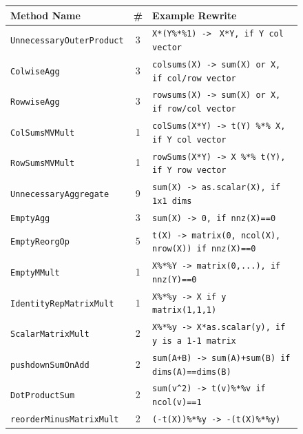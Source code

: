 \begin{figure}
    \centering
    \begin{tabular}{|l|c|l|}
    \hline
     Method Name & \# & Example Rewrite \\
     \hline
     
\verb|UnnecessaryOuterProduct| & 3 & \verb|X*(Y%*%1) ->| \verb| X*Y, if Y col vector |\\

\verb|ColwiseAgg| & 3 & \verb|colsums(X) -> sum(X) or X, if col/row vector |\\

\verb|RowwiseAgg| & 3 & \verb|rowsums(X) -> sum(X) or X, if row/col vector |\\

\verb|ColSumsMVMult| & 1 & \verb|colSums(X*Y) -> t(Y) %*% X, if Y col vector |\\

\verb|RowSumsMVMult| & 1 & \verb|rowSums(X*Y) -> X %*% t(Y), if Y row vector |\\

\verb|UnnecessaryAggregate| & 9 & \verb|sum(X) -> as.scalar(X), if 1x1 dims |\\
\verb|EmptyAgg| & 3 & \verb|sum(X) -> 0, if nnz(X)==0 |\\
\verb|EmptyReorgOp| & 5 & \verb|t(X) -> matrix(0, ncol(X), nrow(X)) if nnz(X)==0|\\
\verb|EmptyMMult| & 1 & \verb|X%*%Y -> matrix(0,...), if nnz(Y)==0|\\
\verb|IdentityRepMatrixMult| & 1 & \verb|X%*%y -> X if y matrix(1,1,1) |\\
\verb|ScalarMatrixMult| & 2 & \verb|X%*%y -> X*as.scalar(y), if y is a 1-1 matrix |\\
\verb|pushdownSumOnAdd| & 2 & \verb|sum(A+B) -> sum(A)+sum(B) if dims(A)==dims(B) |\\

\verb|DotProductSum| & 2 & \verb|sum(v^2) -> t(v)%*%v if ncol(v)==1 |\\
\verb|reorderMinusMatrixMult| & 2 & \verb|(-t(X))%*%y -> -(t(X)%*%y) |\\


\end{tabular}
\end{figure}
